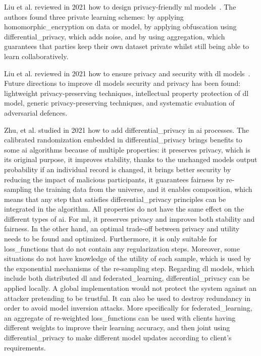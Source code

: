 Liu et al. reviewed in 2021 how to design privacy-friendly \gls{ml} models~\cite{liu_when_2021}. The authors found three private learning schemes: by applying \gls{homomorphic_encryption} on data or model, by applying obfuscation using \gls{differential_privacy}, which adds noise, and by using aggregation, which guarantees that parties keep their own dataset private whilst still being able to learn collaboratively. %

Liu et al. reviewed in 2021 how to ensure privacy and security with \gls{dl} models~\cite{liu_privacy_2021}. Future directions to improve \gls{dl} models security and privacy has been found: lightweight privacy-preserving techniques, intellectual property protection of \gls{dl} model, generic privacy-preserving techniques, and systematic evaluation of adversarial defences. %

Zhu, et al. \cite{zhu_more_2021} studied in 2021 how to add \gls{differential_privacy} in \gls{ai} processes. The calibrated randomization embedded in \gls{differential_privacy} brings benefits to some \gls{ai} algorithms because of multiple properties: it preserves privacy, which is its original purpose, it improves stability, thanks to the unchanged models output probability if an individual record is changed, it brings better security by reducing the impact of malicious participants, it guarantees fairness by re-sampling the training data from the universe, and it enables composition, which means that any step that satisfies \gls{differential_privacy} principles can be integrated in the algorithm. All properties do not have the same effect on the different types of \gls{ai}. For \gls{ml}, it preserves privacy and improves both stability and fairness. In the other hand, an optimal trade-off between privacy and utility needs to be found and optimized. Furthermore, it is only suitable for \glspl{loss_function} that do not contain any \gls{regularization} steps. Moreover, some situations do not have knowledge of the utility of each sample, which is used by the exponential mechanisms of the re-sampling step. Regarding \gls{dl} models, which include both distributed \gls{dl} and \gls{federated_learning}, \gls{differential_privacy} can be applied locally. A global implementation would not protect the system against an attacker pretending to be trustful. It can also be used to destroy redundancy in order to avoid model inversion attacks. More specifically for \gls{federated_learning}, an aggregate of re-weighted \glspl{loss_function} can be used with clients having different weights to improve their learning accuracy, and then joint using \gls{differential_privacy} to make different model updates according to client's requirements. %

